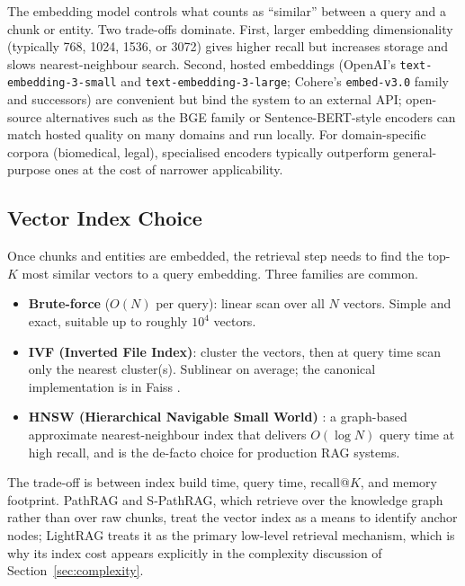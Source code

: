 \documentclass[12pt,a4paper,oneside]{report}
\begin{document}
The embedding model controls what counts as ``similar'' between a
query and a chunk or entity. Two trade-offs dominate. First, larger
embedding dimensionality (typically 768, 1024, 1536, or 3072) gives
higher recall but increases storage and slows nearest-neighbour
search. Second, hosted embeddings (OpenAI's
\texttt{text-embedding-3-small} and \texttt{text-embedding-3-large};
Cohere's \texttt{embed-v3.0} family and successors) are convenient
but bind the system to an external API; open-source alternatives
such as the BGE family \citep{xiao2023bge} or Sentence-BERT-style
encoders \citep{reimers2019sbert} can match hosted quality on many
domains and run locally. For domain-specific corpora (biomedical,
legal), specialised encoders typically outperform general-purpose
ones at the cost of narrower applicability.

\subsection{Vector Index Choice}

Once chunks and entities are embedded, the retrieval step needs to
find the top-$K$ most similar vectors to a query embedding. Three
families are common.
\begin{itemize}[leftmargin=2em,itemsep=2pt]
    \item \textbf{Brute-force} ($O(N)$ per query): linear scan over
          all $N$ vectors. Simple and exact, suitable up to roughly
          $10^4$ vectors.
    \item \textbf{IVF (Inverted File Index)}: cluster the vectors,
          then at query time scan only the nearest cluster(s).
          Sublinear on average; the canonical implementation is in
          Faiss \citep{johnson2017faiss}.
    \item \textbf{HNSW (Hierarchical Navigable Small World)}
          \citep{malkov2018hnsw}: a graph-based approximate
          nearest-neighbour index that delivers $O(\log N)$ query time
          at high recall, and is the de-facto choice for production
          RAG systems.
\end{itemize}

The trade-off is between index build time, query time, recall@$K$,
and memory footprint. PathRAG and S-PathRAG, which retrieve over the
knowledge graph rather than over raw chunks, treat the vector index
as a means to identify anchor nodes; LightRAG treats it as the
primary low-level retrieval mechanism, which is why its index cost
appears explicitly in the complexity discussion of
Section~\ref{sec:complexity}.
\end{document}
